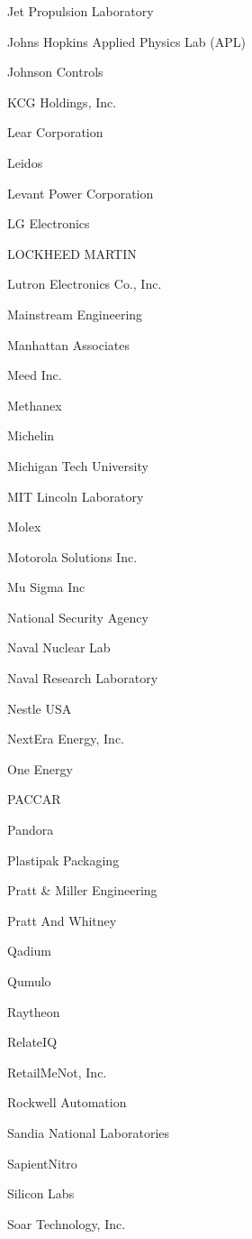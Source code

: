 \documentclass[twoside]{article}
\begin{document}
\begin{center}
\begin{multicols}{5}
\begin{FlushLeft}
\begin{compactitem}
\item Jet Propulsion Laboratory
\item Johns Hopkins Applied Physics Lab (APL)
\item Johnson Controls
\item KCG Holdings, Inc.
\item Lear Corporation
\item Leidos
\item Levant Power Corporation
\item LG Electronics
\item LOCKHEED MARTIN
\item Lutron Electronics Co., Inc.
\item Mainstream Engineering
\item Manhattan Associates
\item Meed Inc.
\item Methanex
\item Michelin
\item Michigan Tech University
\item MIT Lincoln Laboratory
\item Molex
\item Motorola Solutions Inc.
\item Mu Sigma Inc
\item National Security Agency
\item Naval Nuclear Lab
\item Naval Research Laboratory
\item Nestle USA
\item NextEra Energy, Inc.
\item One Energy
\item PACCAR
\item Pandora
\item Plastipak Packaging
\item Pratt \& Miller Engineering
\item Pratt And Whitney
\item Qadium
\item Qumulo
\item Raytheon
\item RelateIQ
\item RetailMeNot, Inc.
\item Rockwell Automation
\item Sandia National Laboratories
\item SapientNitro
\item Silicon Labs
\item Soar Technology, Inc.

\end{compactitem}
\end{FlushLeft}
\end{multicols}
\end{center}
\end{document}
